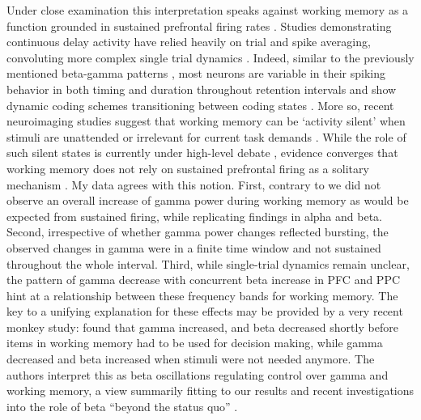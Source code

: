 Under close examination this interpretation speaks against working memory as a function grounded in sustained prefrontal firing rates \parencite{Funahashi1989,Fuster1971,Goldman-Rakic1995,Pasternak2005}. Studies demonstrating continuous delay activity have relied heavily on trial and spike averaging, convoluting more complex single trial dynamics \parencite{Rainer2002,Shafi2007}. Indeed, similar to the previously mentioned beta-gamma patterns \parencite{Lundqvist2016}, most neurons are variable in their spiking behavior in both timing and duration throughout retention intervals and show dynamic coding schemes transitioning between coding states \parencite{Cromer2010,Durstewitz2006,Spaak2017,Stokes2013}. More so, recent neuroimaging studies suggest that working memory can be ‘activity silent’ when stimuli are unattended or irrelevant for current task demands \parencite{Lewis-Peacock2012,Stokes2015,Wolff2015,Wolff2017}. While the role of such silent states is currently under high-level debate \parencite{Christophel2018}, evidence converges that working memory does not rely on sustained prefrontal firing as a solitary mechanism \parencite{Lundqvist2018,Spaak2017}. My data agrees with this notion. First, contrary to \textcite{Haegens2010} we did not observe an overall increase of gamma power during working memory as would be expected from sustained firing, while replicating findings in alpha and beta. Second, irrespective of whether gamma power changes reflected bursting, the observed changes in gamma were in a finite time window and not sustained throughout the whole interval. Third, while single-trial dynamics remain unclear, the pattern of gamma decrease with concurrent beta increase in PFC and PPC hint at a relationship between these frequency bands for working memory. 
The key to a unifying explanation for these effects may be provided by a very recent monkey study: \textcite{Lundqvist2018} found that gamma increased, and beta decreased shortly before items in working memory had to be used for decision making, while gamma decreased and beta increased when stimuli were not needed anymore. The authors interpret this as beta oscillations regulating control over gamma and working memory, a view summarily fitting to our results and recent investigations into the role of beta “beyond the status quo” \parencite{Haegens2017,Ludwig2018,Lundqvist2018,Spitzer2017}. 
